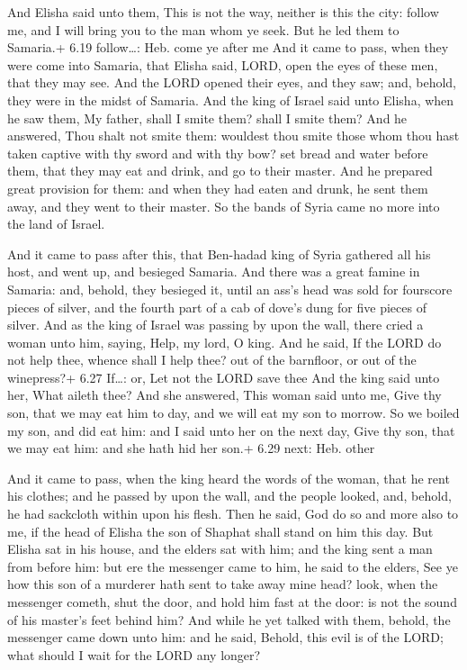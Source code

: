  And Elisha said unto them, This is not the way, neither
is this the city: follow me, and I will bring you to the man whom ye
seek. But he led them to Samaria.+ 6.19 follow\ldots: Heb. come ye after
me  And it came to pass, when they were come into Samaria,
that Elisha said, LORD, open the eyes of these men, that they may see.
And the LORD opened their eyes, and they saw; and, behold, they were in
the midst of Samaria.  And the king of Israel said unto
Elisha, when he saw them, My father, shall I smite them? shall I smite
them?  And he answered, Thou shalt not smite them: wouldest
thou smite those whom thou hast taken captive with thy sword and with
thy bow? set bread and water before them, that they may eat and drink,
and go to their master.  And he prepared great provision
for them: and when they had eaten and drunk, he sent them away, and they
went to their master. So the bands of Syria came no more into the land
of Israel.

 And it came to pass after this, that Ben-hadad king of
Syria gathered all his host, and went up, and besieged Samaria.
 And there was a great famine in Samaria: and, behold, they
besieged it, until an ass's head was sold for fourscore pieces of
silver, and the fourth part of a cab of dove's dung for five pieces of
silver.  And as the king of Israel was passing by upon the
wall, there cried a woman unto him, saying, Help, my lord, O king.
 And he said, If the LORD do not help thee, whence shall I
help thee? out of the barnfloor, or out of the winepress?+ 6.27
If\ldots: or, Let not the LORD save thee  And the king said
unto her, What aileth thee? And she answered, This woman said unto me,
Give thy son, that we may eat him to day, and we will eat my son to
morrow.  So we boiled my son, and did eat him: and I said
unto her on the next day, Give thy son, that we may eat him: and she
hath hid her son.+ 6.29 next: Heb. other

 And it came to pass, when the king heard the words of
the woman, that he rent his clothes; and he passed by upon the wall, and
the people looked, and, behold, he had sackcloth within upon his flesh.
 Then he said, God do so and more also to me, if the head
of Elisha the son of Shaphat shall stand on him this day. 
But Elisha sat in his house, and the elders sat with him; and the king
sent a man from before him: but ere the messenger came to him, he said
to the elders, See ye how this son of a murderer hath sent to take away
mine head? look, when the messenger cometh, shut the door, and hold him
fast at the door: is not the sound of his master's feet behind him?
 And while he yet talked with them, behold, the messenger
came down unto him: and he said, Behold, this evil is of the LORD; what
should I wait for the LORD any longer?

